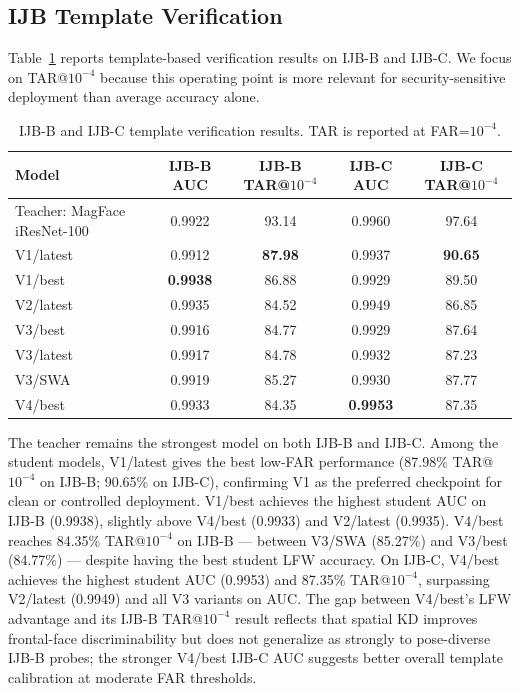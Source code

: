 \subsection{IJB Template Verification}

Table~\ref{tab:ijb_results} reports template-based verification results on IJB-B and IJB-C. We focus on TAR@$10^{-4}$ because this operating point is more relevant for security-sensitive deployment than average accuracy alone\cite{ijbb,ijbc}.

\begin{table}[h]
\centering
\caption{IJB-B and IJB-C template verification results. TAR is reported at FAR=$10^{-4}$.}
\label{tab:ijb_results}
\begin{tabular}{lcccc}
\hline
\textbf{Model} & \textbf{IJB-B AUC} & \textbf{IJB-B TAR@$10^{-4}$} & \textbf{IJB-C AUC} & \textbf{IJB-C TAR@$10^{-4}$} \\
\hline
Teacher: MagFace iResNet-100 & 0.9922 & 93.14 & 0.9960 & 97.64 \\
V1/latest & 0.9912 & \textbf{87.98} & 0.9937 & \textbf{90.65} \\
V1/best & \textbf{0.9938} & 86.88 & 0.9929 & 89.50 \\
V2/latest & 0.9935 & 84.52 & 0.9949 & 86.85 \\
V3/best & 0.9916 & 84.77 & 0.9929 & 87.64 \\
V3/latest & 0.9917 & 84.78 & 0.9932 & 87.23 \\
V3/SWA & 0.9919 & 85.27 & 0.9930 & 87.77 \\
V4/best & 0.9933 & 84.35 & \textbf{0.9953} & 87.35 \\
\hline
\end{tabular}
\end{table}

The teacher remains the strongest model on both IJB-B and IJB-C. Among the student models, V1/latest gives the best low-FAR performance (87.98\% TAR@$10^{-4}$ on IJB-B; 90.65\% on IJB-C), confirming V1 as the preferred checkpoint for clean or controlled deployment. V1/best achieves the highest student AUC on IJB-B (0.9938), slightly above V4/best (0.9933) and V2/latest (0.9935). V4/best reaches 84.35\% TAR@$10^{-4}$ on IJB-B — between V3/SWA (85.27\%) and V3/best (84.77\%) — despite having the best student LFW accuracy. On IJB-C, V4/best achieves the highest student AUC (0.9953) and 87.35\% TAR@$10^{-4}$, surpassing V2/latest (0.9949) and all V3 variants on AUC. The gap between V4/best's LFW advantage and its IJB-B TAR@$10^{-4}$ result reflects that spatial KD improves frontal-face discriminability but does not generalize as strongly to pose-diverse IJB-B probes; the stronger V4/best IJB-C AUC suggests better overall template calibration at moderate FAR thresholds.

